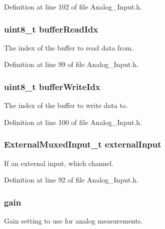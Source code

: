 Definition at line 102 of file Analog\-\_\-\-Input.\-h.

\hypertarget{struct_analog___input__t_ab88d160dc09c608f10a13c1b4cc06885}{
\subsubsection[{buffer\-Read\-Idx}]{\setlength{\rightskip}{0pt plus 5cm}uint8\-\_\-t buffer\-Read\-Idx}}\label{struct_analog___input__t_ab88d160dc09c608f10a13c1b4cc06885}
The index of the buffer to read data from. 

Definition at line 99 of file Analog\-\_\-\-Input.\-h.

\hypertarget{struct_analog___input__t_af6dc1e03b08d833bcad0d2a9ddacb9b2}{
\subsubsection[{buffer\-Write\-Idx}]{\setlength{\rightskip}{0pt plus 5cm}uint8\-\_\-t buffer\-Write\-Idx}}\label{struct_analog___input__t_af6dc1e03b08d833bcad0d2a9ddacb9b2}
The index of the buffer to write data to. 

Definition at line 100 of file Analog\-\_\-\-Input.\-h.

\hypertarget{struct_analog___input__t_abb199000d1f8af50de782aecf1f42108}{
\subsubsection[{external\-Input}]{\setlength{\rightskip}{0pt plus 5cm}External\-Muxed\-Input\-\_\-t external\-Input}}\label{struct_analog___input__t_abb199000d1f8af50de782aecf1f42108}
If an external input, which channel. 

Definition at line 92 of file Analog\-\_\-\-Input.\-h.

\hypertarget{struct_analog___input__t_a9eb75430d096aa3e9c2211f836ae0b88}{
\subsubsection[{gain}]{ gain}}\label{struct_analog___input__t_a9eb75430d096aa3e9c2211f836ae0b88}
Gain setting to use for analog measurements. 

